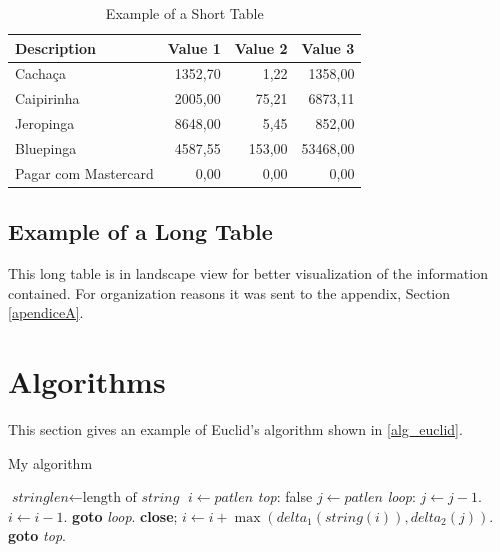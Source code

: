 \begin{table}[htb]
    \centering
    \caption{Example of a Short Table}
    \label{tab_shorttable}
    \begin{tabular}{lrrr}
    \hline
        Description          & \multicolumn{1}{c}{Value 1} & \multicolumn{1}{c}{Value 2} & \multicolumn{1}{c}{Value 3} \\ \hline
        Cachaça              & 1352,70                     & 1,22                        & 1358,00                     \\
        Caipirinha           & 2005,00                     & 75,21                       & 6873,11                     \\
        Jeropinga            & 8648,00                     & 5,45                        & 852,00                      \\
        Bluepinga            & 4587,55                     & 153,00                      & 53468,00                    \\
        Pagar com Mastercard & 0,00                        & 0,00                        & 0,00                        \\ \hline
    \end{tabular}
\end{table}

\subsection{Example of a Long Table}
\label{subsec_longtable}

This  long table is in landscape view for better visualization of the information contained. For organization reasons it was sent to the appendix, Section \ref{apendiceA}.


\section{Algorithms}

This section gives an example of Euclid’s  algorithm shown in \ref{alg_euclid}.

\begin{algorithm}
\caption{My algorithm}\label{alg_euclid}
    \begin{algorithmic}[1]
    \State $\textit{stringlen} \gets \text{length of }\textit{string}$
    \State $i \gets \textit{patlen}$
    \BState \emph{top}:
     \Return false
    \EndIf
    \State $j \gets \textit{patlen}$
    \BState \emph{loop}:
    \State $j \gets j-1$.
    \State $i \gets i-1$.
    \State \textbf{goto} \emph{loop}.
    \State \textbf{close};
    \EndIf
    \State $i \gets i+\max(\textit{delta}_1(\textit{string}(i)),\textit{delta}_2(j))$.
    \State \textbf{goto} \emph{top}.
    \EndProcedure
    \end{algorithmic}
\end{algorithm}

